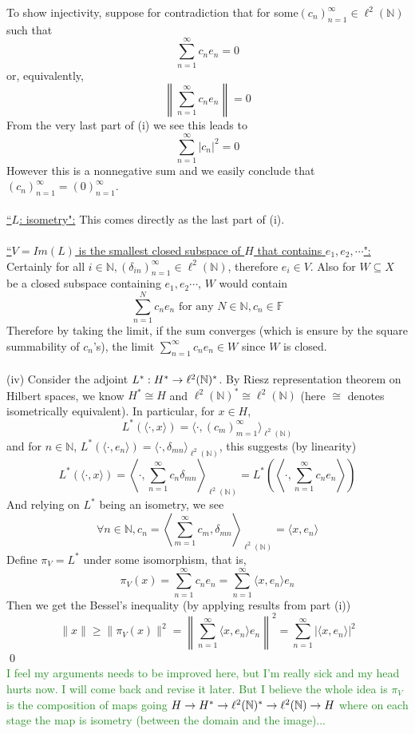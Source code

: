 \documentclass[12pt,a4paper]{article}
\newcommand{\fgreen}[1]{\textcolor{ForestGreen}{#1}}
\newcommand{\ra}[1]{\ifnum #1=1\rightarrow\fi\ifnum #1=2\Rightarrow\fi}
\newcommand{\claim}[1]{\underline{``{#1}":}}
\renewcommand{\l}{\left}\renewcommand{\r}{\right}
\newcommand{\SUM}[2]{\sum\limits_{#1}^{#2}}
\newcommand{\N}{\mathbb N}%
\begin{document}
To show injectivity, suppose for contradiction that for some$(c_n)_{n=1}^\infty \in \ell^2(\N)$ such that 
$$\SUM{n=1}\infty c_n e_n = 0$$
or, equivalently, 
$$\l\|\SUM{n=1}\infty c_n e_n \r\| = 0$$
From the very last part of (i) we see this leads to 
$$\SUM{n=1}\infty |c_n|^2 = 0$$
However this is a nonnegative sum and we easily conclude that $(c_n)_{n=1}^\infty = (0)_{n=1}^\infty$. \\
\\
\claim{$L$: isometry} This comes directly as the last part of (i). \\
\\
\claim{$V = Im(L)$ is the smallest closed subspace of $H$ that contains $e_1,e_2,\cdots$} Certainly for all $i \in \N, (\delta_{in})_{n=1}^\infty \in \ell^2(\N)$, therefore $e_i \in V$. Also for $W \subseteq X$ be a closed subspace containing $e_1, e_2 \cdots$, $W$ would contain 
$$\SUM{n=1}N c_n e_n \text{ for any } N\in\N, c_n \in \mathbb F$$
Therefore by taking the limit, if the sum converges (which is ensure by the square summability of $c_n$'s), the limit $\SUM{n=1}\infty c_n e_n \in W$ since $W$ is closed. \\
\\
(iv) Consider the adjoint $L^\ast: H^\ast \ra1 \ell^2(\N)^\ast$. By Riesz representation theorem on Hilbert spaces, we know $H^\ast \cong H$ and $\ell^2(\N)^\ast \cong \ell^2(\N)$ (here $\cong$ denotes isometrically equivalent). In particular, for $x\in H$, 
$$L^\ast(\langle \cdot, x \rangle) = \langle \cdot, (c_m)_{m=1}^\infty \rangle_{\ell^2(\N)}$$
and for $n\in\N$, $L^\ast(\langle \cdot, e_n \rangle) = \langle \cdot, \delta_{mn}\rangle_{\ell^2(\N)}$, this suggests (by linearity)
$$L^\ast(\langle \cdot, x \rangle) = \l\langle \cdot, \SUM{n=1}\infty c_n \delta_{mn}\r\rangle_{\ell^2(\N)} = L^\ast\l(\l\langle \cdot, \SUM{n=1}\infty c_n e_n\r\rangle\r)$$
And relying on $L^\ast$ being an isometry, we see 
$$\forall n\in\N, c_n = \l\langle \SUM{m=1}\infty c_m, \delta_{mn}\r\rangle_{\ell^2(\N)} = \langle x, e_n\rangle$$
Define $\pi_V = L^\ast$ under some isomorphism, that is, 
$$\pi_V(x) = \SUM{n=1}\infty c_n e_n = \SUM{n=1}\infty \langle x, e_n \rangle e_n$$
Then we get the Bessel's inequality (by applying results from part (i))
$$\|x\| \geq \|\pi_V(x)\|^2 = \l\|\SUM{n=1}\infty \langle x, e_n\rangle e_n\r\|^2 = \SUM{n=1}\infty |\langle x, e_n\rangle|^2$$
\qed\\
\fgreen{I feel my arguments needs to be improved here, but I'm really sick and my head hurts now. I will come back and revise it later. But I believe the whole idea is $\pi_V$ is the composition of maps going $H \ra1 H^\ast \ra1 \ell^2(\N)^\ast \ra1 \ell^2(\N) \ra1 H$ where on each stage the map is isometry (between the domain and the image)...}
\end{document}
